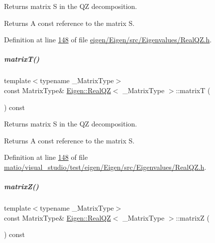 Returns matrix S in the QZ decomposition. 

\begin{DoxyReturn}{Returns}
A const reference to the matrix S. 
\end{DoxyReturn}


Definition at line \hyperlink{eigen_2_eigen_2src_2_eigenvalues_2_real_q_z_8h_source_l00148}{148} of file \hyperlink{eigen_2_eigen_2src_2_eigenvalues_2_real_q_z_8h_source}{eigen/\+Eigen/src/\+Eigenvalues/\+Real\+Q\+Z.\+h}.

\mbox{\label{group___eigenvalues___module_a8dc963d8ea2a17df9d8d718e9e34d06f}} 
\subparagraph{\texorpdfstring{matrix\+T()}{matrixT()}\hspace{0.1cm}{\footnotesize\ttfamily [2/2]}}
{\footnotesize\ttfamily template$<$typename \+\_\+\+Matrix\+Type$>$ \\
const Matrix\+Type\& \hyperlink{group___eigenvalues___module_class_eigen_1_1_real_q_z}{Eigen\+::\+Real\+QZ}$<$ \+\_\+\+Matrix\+Type $>$\+::matrixT (\begin{DoxyParamCaption}{ }\end{DoxyParamCaption}) const\hspace{0.3cm}{\ttfamily [inline]}}



Returns matrix S in the QZ decomposition. 

\begin{DoxyReturn}{Returns}
A const reference to the matrix S. 
\end{DoxyReturn}


Definition at line \hyperlink{matio_2visual__studio_2test_2eigen_2_eigen_2src_2_eigenvalues_2_real_q_z_8h_source_l00148}{148} of file \hyperlink{matio_2visual__studio_2test_2eigen_2_eigen_2src_2_eigenvalues_2_real_q_z_8h_source}{matio/visual\+\_\+studio/test/eigen/\+Eigen/src/\+Eigenvalues/\+Real\+Q\+Z.\+h}.

\mbox{\label{group___eigenvalues___module_a19a116383f11423179b4d8f316da6f67}} 
\subparagraph{\texorpdfstring{matrix\+Z()}{matrixZ()}\hspace{0.1cm}{\footnotesize\ttfamily [1/2]}}
{\footnotesize\ttfamily template$<$typename \+\_\+\+Matrix\+Type$>$ \\
const Matrix\+Type\& \hyperlink{group___eigenvalues___module_class_eigen_1_1_real_q_z}{Eigen\+::\+Real\+QZ}$<$ \+\_\+\+Matrix\+Type $>$\+::matrixZ (\begin{DoxyParamCaption}{ }\end{DoxyParamCaption}) const\hspace{0.3cm}{\ttfamily [inline]}}



